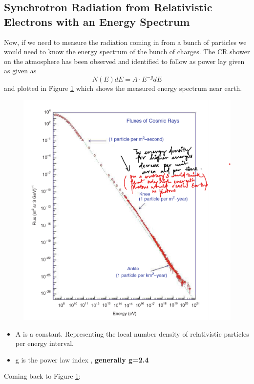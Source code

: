 \documentclass[11pt]{report}
\begin{document}
\subsection{Synchrotron Radiation from Relativistic Electrons with an Energy Spectrum}
Now, if we need to measure the radiation coming in from a bunch of particles we would need to know the energy spectrum of the bunch of charges. The CR shower on the atmosphere has been observed and identified to follow as power lay given as given as
\begin{equation}
N(E)dE=A\cdot E^{-g}dE
\end{equation}
and plotted in Figure \ref{figepower} which shows the measured energy spectrum near earth.
\begin{figure}\label{figepower}
\includegraphics[scale=1]{figepower.png}
\end{figure}
\begin{itemize}
\item A is a constant. Representing the local number density of relativistic particles per energy interval.
\item g is the power law index , \textbf{generally g=2.4}
\end{itemize}
Coming back to Figure \ref{figepower}:
\end{document}

